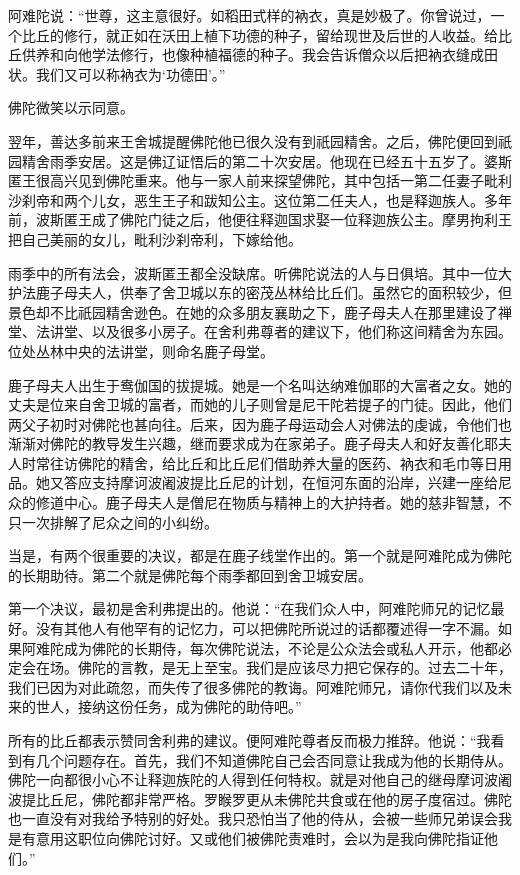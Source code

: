 \documentclass[12pt,twoside,openany]{book}
\begin{document}
阿难陀说：“世尊，这主意很好。如稻田式样的衲衣，真是妙极了。你曾说过，一个比丘的修行，就正如在沃田上植下功德的种子，留给现世及后世的人收益。给比丘供养和向他学法修行，也像种植福德的种子。我会告诉僧众以后把衲衣缝成田状。我们又可以称衲衣为‘功德田’。”

佛陀微笑以示同意。

翌年，善达多前来王舍城提醒佛陀他已很久没有到祇园精舍。之后，佛陀便回到祇园精舍雨季安居。这是佛辽证悟后的第二十次安居。他现在已经五十五岁了。婆斯匿王很高兴见到佛陀重来。他与一家人前来探望佛陀，其中包括一第二任妻子毗利沙刹帝和两个儿女，恶生王子和跋知公主。这位第二任夫人，也是释迦族人。多年前，波斯匿王成了佛陀门徒之后，他便往释迦国求娶一位释迦族公主。摩男拘利王把自己美丽的女儿，毗利沙刹帝利，下嫁给他。

雨季中的所有法会，波斯匿王都全没缺席。听佛陀说法的人与日俱培。其中一位大护法鹿子母夫人，供奉了舍卫城以东的密茂丛林给比丘们。虽然它的面积较少，但景色却不比祇园精舍逊色。在她的众多朋友襄助之下，鹿子母夫人在那里建设了禅堂、法讲堂、以及很多小房子。在舍利弗尊者的建议下，他们称这间精舍为东园。位处丛林中央的法讲堂，则命名鹿子母堂。

鹿子母夫人出生于鸯伽国的拔提城。她是一个名叫达纳难伽耶的大富者之女。她的丈夫是位来自舍卫城的富者，而她的儿子则曾是尼干陀若提子的门徒。因此，他们两父子初时对佛陀也甚向往。后来，因为鹿子母运动会人对佛法的虔诚，令他们也渐渐对佛陀的教导发生兴趣，继而要求成为在家弟子。鹿子母夫人和好友善化耶夫人时常往访佛陀的精舍，给比丘和比丘尼们借助养大量的医药、衲衣和毛巾等日用品。她又答应支持摩诃波阇波提比丘尼的计划，在恒河东面的沿岸，兴建一座给尼众的修道中心。鹿子母夫人是僧尼在物质与精神上的大护持者。她的慈非智慧，不只一次排解了尼众之间的小纠纷。

当是，有两个很重要的决议，都是在鹿子线堂作出的。第一个就是阿难陀成为佛陀的长期助待。第二个就是佛陀每个雨季都回到舍卫城安居。

第一个决议，最初是舍利弗提出的。他说：“在我们众人中，阿难陀师兄的记忆最好。没有其他人有他罕有的记忆力，可以把佛陀所说过的话都覆述得一字不漏。如果阿难陀成为佛陀的长期侍，每次佛陀说法，不论是公众法会或私人开示，他都必定会在场。佛陀的言教，是无上至宝。我们是应该尽力把它保存的。过去二十年，我们已因为对此疏忽，而失传了很多佛陀的教诲。阿难陀师兄，请你代我们以及未来的世人，接纳这份任务，成为佛陀的助侍吧。”

所有的比丘都表示赞同舍利弗的建议。便阿难陀尊者反而极力推辞。他说：“我看到有几个问题存在。首先，我们不知道佛陀自己会否同意让我成为他的长期侍从。佛陀一向都很小心不让释迦族陀的人得到任何特权。就是对他自己的继母摩诃波阇波提比丘尼，佛陀都非常严格。罗睺罗更从未佛陀共食或在他的房子度宿过。佛陀也一直没有对我给予特别的好处。我只恐怕当了他的侍从，会被一些师兄弟误会我是有意用这职位向佛陀讨好。又或他们被佛陀责难时，会以为是我向佛陀指证他们。”
\end{document}
